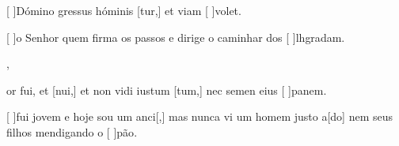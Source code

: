 {  {\item {}[ ]{Dó}mino gressus hóminis [tur,] et viam [ ]{vo}let.~\Antiphona}%
    {\item {}[ ]{o} Senhor quem firma os passos  e dirige o caminhar dos [ ]{lh}{gra}dam.~\Antiphona},
  {\item {}or fui, et [nui,] et non vidi iustum [\-tum,] nec semen eius [ ]{pa}nem.~\Antiphona}%
    {\item {}[ ]{fui} jovem e hoje sou um anci[,] mas nunca vi um homem justo a[do] nem seus filhos mendigando o [ ]{pão}.~\Antiphona}
}